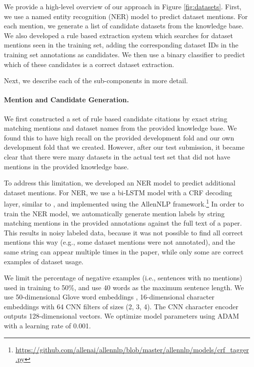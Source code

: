 \documentclass[11pt]{article}
\begin{document}
We provide a high-level overview of our approach in Figure \ref{fig:datasets}.
First, we use a named entity recognition (NER) model to predict dataset mentions. 
For each mention, we generate a list of candidate datasets from the knowledge base. 
We also developed a rule based extraction system which searches for dataset mentions seen in the training set, adding the corresponding dataset IDs in the training set annotations as candidates.
We then use a binary classifier to predict which of these candidates is a correct dataset extraction.

Next, we describe each of the sub-components in more detail.

\paragraph{Mention and Candidate Generation.}
We first constructed a set of rule based candidate citations by exact string matching mentions and dataset names from the provided knowledge base. We found this to have high recall on the provided development fold and our own development fold that we created. However, after our test submission, it became clear that there were many datasets in the actual test set that did not have mentions in the provided knowledge base.

To address this limitation, we developed an NER model to predict additional dataset mentions.
For NER, we use a bi-LSTM model with a CRF decoding layer, similar to \cite{Peters2018DEEPCW}, and implemented using the AllenNLP framework.\footnote{\url{https://github.com/allenai/allennlp/blob/master/allennlp/models/crf_tagger.py}}
In order to train the NER model, we automatically generate mention labels by string matching mentions in the provided annotations against the full text of a paper.
This results in noisy labeled data, because it was not possible to find all correct mentions this way (e.g., some dataset mentions were not annotated), and the same string can appear multiple times in the paper, while only some are correct examples of dataset usage.

We limit the percentage of negative examples (i.e., sentences with no mentions) used in training to 50\%, and use 40 words as the maximum sentence length.
We use 50-dimensional Glove word embeddings \cite{Pennington2014GloveGV}, 16-dimensional character embeddings with 64 CNN filters of sizes (2, 3, 4).
The CNN character encoder outputs 128-dimensional vectors.
We optimize model parameters using ADAM \cite{Kingma2014AdamAM} with a learning rate of 0.001.
\end{document}
